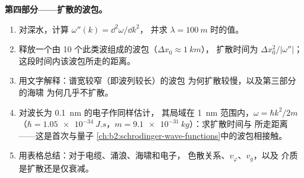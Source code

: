 \begin{problem}
\medskip
\noindent\textbf{第四部分——扩散的波包。}
\begin{enumerate}[resume]
  \item 对深水，计算 $\omega''(k) = \dd^2\omega/\dd k^2$，
        并求 $\lambda = \qty{100}{m}$ 时的值。
  \item 释放一个由 \qty{10}{} 个此类波组成的波包（$\Delta x_0 \approx \qty{1}{km}$），
        扩散时间为 $\Delta x_0^2/|\omega''|$；
        这段时间内该波包所走的距离。
  \item 用文字解释：谱宽较窄（即波列较长）的波包
        为何扩散较慢，以及第三部分的海啸
        为何几乎不扩散。
  \item 对波长为 \qty{0.1}{nm} 的电子作同样估计，
        其局域在 \qty{1}{nm} 范围内，$\omega = \hbar k^2/2m$（$\hbar =
        \qty{1.05e-34}{J.s}$，$m = \qty{9.1e-31}{kg}$）：求扩散时间与
        所走距离——这是首次与量子
        \cref{ch:b2:schrodinger-wave-functions}中的波包相接触。
  \item 用表格总结：对于电缆、涌浪、海啸和电子，
        色散关系、$v_\varphi$、$v_g$，以及
        介质是扩散还是仅衰减。
\end{enumerate}
\end{problem}
